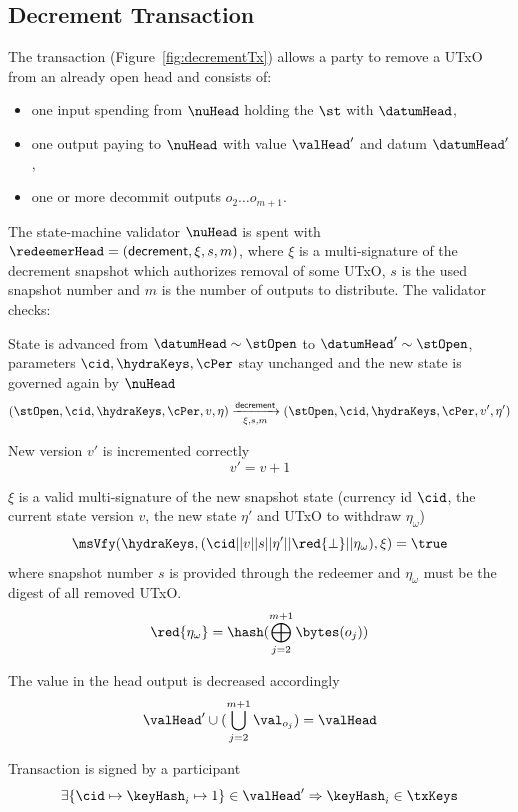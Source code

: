 \subsection{Decrement Transaction}\label{sec:decrement-tx}

\noindent The \mtxDecrement{} transaction (Figure~\ref{fig:decrementTx}) allows
a party to remove a UTxO from an already open head and consists of:

\begin{itemize}
  \item one input spending from $\nuHead$ holding the $\st$ with $\datumHead$,
  \item one output paying to $\nuHead$ with value $\valHead'$ and
  datum $\datumHead'$,
  \item one or more decommit outputs $o_{2} \dots o_{m+1}$.
\end{itemize}

\noindent The state-machine validator $\nuHead$ is spent with
$\redeemerHead = (\mathsf{decrement}, \xi, s, m)$, where $\xi$ is a multi-signature of
the decrement snapshot which authorizes removal of some UTxO, $s$ is the
used snapshot number and $m$ is the number of outputs to distribute. The
validator checks:
\begin{menumerate}
  \item State is advanced from $\datumHead \sim \stOpen$ to
  $\datumHead' \sim \stOpen$, parameters $\cid,\hydraKeys,\cPer$ stay
  unchanged and the new state is governed again by $\nuHead$
  \[
	(\stOpen,\cid,\hydraKeys,\cPer,v,\eta) \xrightarrow[\xi, s, m]{\mathsf{decrement}} (\stOpen,\cid,\hydraKeys,\cPer,v',\eta')
  \]
  \item New version $v'$ is incremented correctly
  \[
	v' = v + 1
  \]
  \item $\xi$ is a valid multi-signature of the new snapshot state (currency id $\cid$, the current state version $v$, the new state $\eta'$  and UTxO to withdraw $\eta_\omega$)
  \[
	\msVfy(\hydraKeys,(\cid || v || s || \eta' || \red{\bot} || \eta_\omega),\xi) = \true
  \]
  where snapshot number $s$ is provided through the redeemer and $\eta_\omega$ must be the digest of all removed UTxO.
  \[
	\red{\eta_\omega} = \hash(\bigoplus_{j=2}^{m+1} \bytes(o_{j}))
  \]
  \item The value in the head output is decreased accordingly
  \[
	\valHead' \cup (\bigcup_{j=2}^{m+1} \val_{o_{j}}) = \valHead
  \]
  \item Transaction is signed by a participant
  \[
	\exists \{\cid \mapsto \keyHash_{i} \mapsto 1\} \in \valHead' \Rightarrow \keyHash_{i} \in \txKeys
  \]
\end{menumerate}

